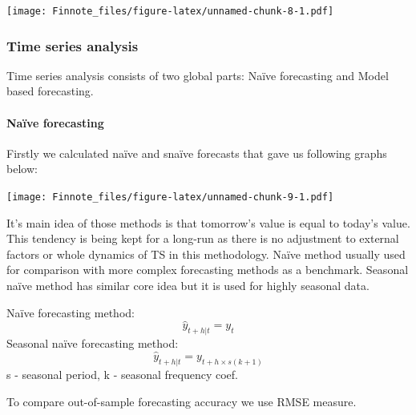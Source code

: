 \documentclass[
]{article}
\begin{document}
\texttt{[image: Finnote\_files/figure-latex/unnamed-chunk-8-1.pdf]}

\hypertarget{time-series-analysis}{%
\subsubsection{Time series analysis}\label{time-series-analysis}}

Time series analysis consists of two global parts: Naïve forecasting and
Model based forecasting.

\hypertarget{nauxefve-forecasting}{%
\paragraph{Naïve forecasting}\label{nauxefve-forecasting}}

Firstly we calculated naïve and snaïve forecasts that gave us following
graphs below:

\texttt{[image: Finnote\_files/figure-latex/unnamed-chunk-9-1.pdf]}

It's main idea of those methods is that tomorrow's value is equal to
today's value. This tendency is being kept for a long-run as there is no
adjustment to external factors or whole dynamics of TS in this
methodology. Naïve method usually used for comparison with more complex
forecasting methods as a benchmark. Seasonal naïve method has similar
core idea but it is used for highly seasonal data.

Naïve forecasting method: \[\hat y_{t+h|t}=y_t\] Seasonal naïve
forecasting method: \[\hat y_{t+h|t}=y_{t+h \times s(k+1)}\] s -
seasonal period, k - seasonal frequency coef.

To compare out-of-sample forecasting accuracy we use RMSE measure.
\end{document}
